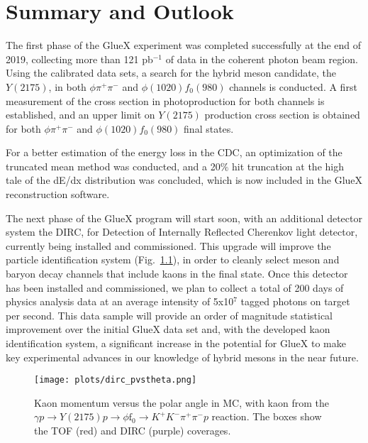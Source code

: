\chapter{Summary and Outlook}
\label{chap.summ}

The first phase of the GlueX experiment was completed successfully at the end of 2019, collecting more than 121 pb$^{-1}$ of data in the coherent photon beam region. Using the calibrated data sets, a search for the hybrid meson candidate, the $Y(2175)$, in both $\phi\pi^{+}\pi^{-}$ and $\phi(1020) f_0(980)$ channels is conducted. A first measurement of the cross section in photoproduction for both channels is established, and an upper limit on $Y(2175)$ production cross section is obtained for both $\phi\pi^{+}\pi^{-}$ and $\phi(1020)f_0(980)$ final states.
~\par For a better estimation of the energy loss in the CDC, an optimization of the truncated mean method was conducted, and a 20$\%$ hit truncation at the high tale of the dE/dx distribution was concluded, which is now included in the GlueX reconstruction software.
~\par The next phase of the GlueX program will start soon, with an additional detector system the DIRC, for Detection of Internally Reflected Cherenkov light detector, currently being installed and commissioned. This upgrade will improve the particle identification system (Fig.~\ref{fig.summ}), in order to cleanly select meson and baryon decay channels that include kaons in the final state. Once this detector has been installed and commissioned, we plan to collect a total of 200 days of physics analysis data at an average intensity of 5x10$^7$ tagged photons on target per second. This data sample will provide an order of magnitude statistical improvement over the initial GlueX data set and, with the developed kaon identification system, a significant increase in the potential for GlueX to make key experimental advances in our knowledge of hybrid mesons in the near future.

\begin{figure}[H]
    \centering
    \texttt{[image: plots/dirc\_pvstheta.png]}
    \caption{Kaon momentum versus the polar angle in MC, with kaon from the $\gamma p \rightarrow Y(2175) p \rightarrow \phi \mathrm{f}_0  \rightarrow  K^{+} K^{-} \pi^{+} \pi^{-} p$ reaction. The boxes show the TOF (red) and DIRC (purple) coverages.}
    \label{fig.summ}
\end{figure}